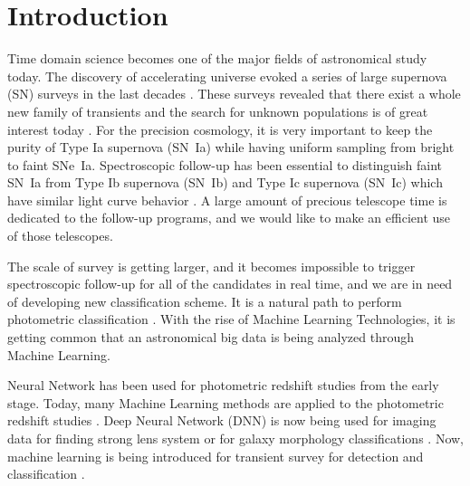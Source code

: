 \documentclass[useamsfonts]{pasj01}
\begin{document}
\section{Introduction}
Time domain science becomes one of the major fields of astronomical study today.  The discovery of accelerating universe \citep{perlmutter99a,riess98a} evoked a series of large supernova (SN) surveys in the last decades 
\citep{betoule14a,scolnic18a,brout19a}.  
These surveys revealed that there exist a whole new family of transients and the search for unknown populations is of great interest today \citep{howell06a,phillips07a,quimby07b}. 
For the precision cosmology, it is very important to keep the purity of Type Ia supernova (SN~Ia) while having uniform sampling from bright to faint SNe~Ia.  Spectroscopic follow-up has been essential to distinguish faint SN~Ia from Type Ib supernova (SN~Ib) and Type Ic supernova (SN~Ic) which have similar light curve behavior \citep{scolnic14a}.   A large amount of precious telescope time is dedicated to the follow-up programs, and we would like to make an efficient use of those telescopes.

The scale of survey is getting larger, and it becomes impossible to trigger spectroscopic follow-up for all of the candidates in real time, and we are in need of developing new classification scheme.  It is a natural path to perform photometric classification \citep{sako11a,jonesl8a}.  With the rise of Machine Learning Technologies, it is getting common that an astronomical big data is being analyzed through Machine Learning.   

Neural Network has been used for photometric redshift studies from the early stage.  Today, many Machine Learning methods are applied to the photometric redshift studies \citep{collister04a,carliles10a,pasquet19a}.
Deep Neural Network (DNN) is now being used for imaging data for finding strong lens system \citep{petrillo17a} or for galaxy morphology classifications \citep{hausen19a}.  Now, machine learning is being introduced for transient survey for detection \citep{goldstein15a} and classification \citep{charnock17a}.
\end{document}
